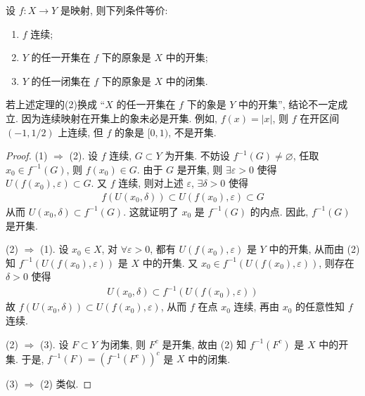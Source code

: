 \documentclass[../../main.tex]{subfiles}
\begin{document}
\begin{theorem}[连续映射的充要条件]\label{theorem:连续映射的充要条件}
设 $f : X \to Y$ 是映射, 则下列条件等价:
\begin{enumerate}[(1)]
\item $f$ 连续;
\item $Y$ 的任一开集在 $f$ 下的原象是 $X$ 中的开集;
\item $Y$ 的任一闭集在 $f$ 下的原象是 $X$ 中的闭集.
\end{enumerate}
\end{theorem}
\begin{remark}
若上述定理的(2)换成 “$X$ 的任一开集在 $f$ 下的象是 $Y$ 中的开集”, 结论不一定成立. 因为连续映射在开集上的象未必是开集. 例如, $f(x) = |x|$, 则 $f$ 在开区间 $(-1, 1/2)$ 上连续, 但 $f$ 的象是 $[0, 1)$, 不是开集. 
\end{remark}
\begin{proof}
(1) $\Rightarrow$ (2). 设 $f$ 连续, $G \subset Y$ 为开集. 不妨设 $f^{-1}(G) \neq \varnothing$, 任取 $x_0 \in f^{-1}(G)$, 则 $f(x_0) \in G$. 由于 $G$ 是开集, 则 $\exists \varepsilon > 0$ 使得 $U(f(x_0), \varepsilon) \subset G$. 又 $f$ 连续, 则对上述 $\varepsilon$, $\exists \delta > 0$ 使得
\begin{align*}
f(U(x_0, \delta)) \subset U(f(x_0), \varepsilon) \subset G
\end{align*}
从而 $U(x_0, \delta) \subset f^{-1}(G)$. 这就证明了 $x_0$ 是 $f^{-1}(G)$ 的内点. 因此, $f^{-1}(G)$ 是开集.

(2) $\Rightarrow$ (1). 设 $x_0 \in X$, 对 $\forall \varepsilon > 0$, 都有 $U(f(x_0), \varepsilon)$ 是 $Y$ 中的开集, 从而由 (2) 知 $f^{-1}(U(f(x_0), \varepsilon))$ 是 $X$ 中的开集. 又 $x_0 \in f^{-1}(U(f(x_0), \varepsilon))$, 则存在 $\delta > 0$ 使得
\begin{align*}
U(x_0, \delta) \subset f^{-1}(U(f(x_0), \varepsilon))
\end{align*}
故 $f(U(x_0, \delta)) \subset U(f(x_0), \varepsilon)$, 从而 $f$ 在点 $x_0$ 连续, 再由 $x_0$ 的任意性知 $f$ 连续.

(2) $\Rightarrow$ (3). 设 $F \subset Y$ 为闭集, 则 $F^c$ 是开集, 故由 (2) 知 $f^{-1}(F^c)$ 是 $X$ 中的开集. 于是, $f^{-1}(F) = (f^{-1}(F^c))^c$ 是 $X$ 中的闭集. 

(3) $\Rightarrow$ (2) 类似.

\end{proof}
\end{document}
